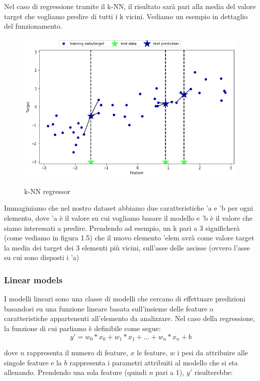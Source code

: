 \documentclass[12pt,italian]{report}
\begin{document}
Nel caso di regressione tramite il k-NN, il risultato sarà pari alla media del valore target che vogliamo predire di tutti i k vicini. Vediamo un esempio in dettaglio del funzionamento.

\begin{figure}[h!]
	\noindent
	\center
	\label{fig:knn_regressor}
	\includegraphics[scale=0.6]{../img/knn_regressor}
	\caption{k-NN regressor}
\end{figure}

\pagebreak

Immaginiamo che nel nostro dataset abbiamo due caratteristiche 'a e 'b per ogni elemento, dove 'a è il valore su cui vogliamo basare il modello e 'b è il valore che siamo interessati a predire. Prendendo ad esempio, un k pari a 3 significherà (come vediamo in figura 1.5) che il nuovo elemento 'elem avrà come valore target la media dei target dei 3 elementi più vicini, sull'asse delle ascisse (ovvero l'asse su cui sono disposti i 'a)
\pagebreak

\subsubsection{Linear models}
I modelli lineari sono una classe di modelli che cercano di effettuare predizioni basandosi su una funzione lineare basata sull'insieme delle feature o caratteristiche appartenenti all'elemento da analizzare. 
Nel caso della regressione, la funzione di cui parliamo è definibile come segue:
\[ y' = w_{0} * x_{0} + w_{1} * x_{1} + ... + w_{n} * x_{n} + b \]


dove $n$ rappresenta il numero di feature, $x$ le feature, $ w $ i pesi da attribuire alle singole feature e la $ b $ rappresenta i parametri attribuiti al modello che si sta allenando.
Prendendo una sola feature (quindi $ n $ pari a 1), $ y' $ risulterebbe:
\end{document}

